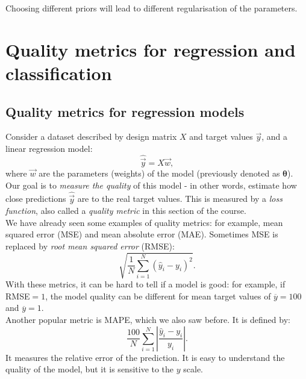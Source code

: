 Choosing different priors will lead to different regularisation of the parameters.





\newpage
\section{Quality metrics for regression and classification}

\subsection{Quality metrics for regression models}
Consider a dataset described by design matrix $X$ and target values $\vec{y}$, and a linear regression model:
\begin{equation*}
\hat{\vec{y}} = X\vec{w},
\end{equation*}
where $\vec{w}$ are the parameters (weights) of the model (previously denoted as $\pmb{\theta}$). Our goal is to \textit{measure the quality} of this model - in other words, estimate how close predictions $\hat{\vec{y}}$ are to the real target values. This is measured by a \textit{loss function}, also called a \textit{quality metric} in this section of the course.\\ 

We have already seen some examples of quality metrics: for example, mean squared error (MSE) and mean absolute error (MAE). Sometimes MSE is replaced by \textit{root mean squared error} (RMSE):
\begin{equation*}
\sqrt{\frac{1}{N} \sum_{i=1}^{N} (\hat{y}_i - y_i)^2}.
\end{equation*} 
With these metrics, it can be hard to tell if a model is good: for example, if RMSE$=1$, the model quality can be different for mean target values of $\overline{y} = 100$ and $\overline{y} = 1$.\\

Another popular metric is MAPE, which we also saw before. It is defined by:
\begin{equation*}
\frac{100}{N} \sum_{i=1}^{N} \left| \frac{\hat{y}_i - y_i}{y_i} \right|.
\end{equation*}
It measures the relative error of the prediction. It is easy to understand the quality of the model, but it is sensitive to the $y$ scale.\\


